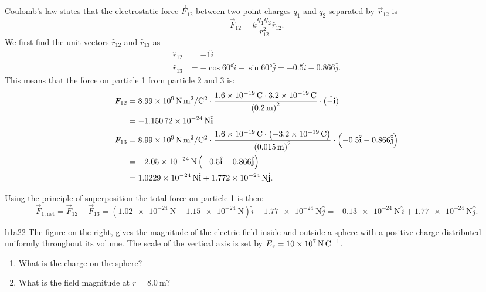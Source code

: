   \begin{derivation}
    Coulomb's law states that the electrostatic force $\Vec{F}_{12}$ between two point charges $q_1$ and $q_2$ separated by $\Vec{r}_{12}$ is
    \begin{equation*}
      \Vec{F}_{12} = k \frac{q_1 q_2}{r_{12}^2} \hat{r}_{12}
    .\end{equation*}
    We first find the unit vectors $\hat{r}_{12}$ and $\hat{r}_{13}$ as
    \begin{align*}
      \hat{r}_{12} &= -1 \hat{i} \\
      \hat{r}_{13} &= -\cos \ang{60} \hat{i} - \sin \ang{60} \hat{j} = -\num{0,5} \hat{i} - \num{0,866}  \hat{j}
    .\end{align*}
    This means that the force on particle 1 from particle 2 and 3 is:
    \begin{align*}
      \Vec{F}_{12} &= \qty{8,99e9}{\N.\m^2\per\C^2} \cdot \frac{\qty{1,6e-19}{\C} \cdot \qty{3,2e-19}{\C}}{\left( \qty{0,2}{\m}  \right)^2} \cdot (\hat{-i}) \\
      &= - \qty{1,15072e-24}{\N} \hat{i} \\
      \Vec{F}_{13} &= \qty{8,99e9}{\N.\m^2\per\C^2} \cdot \frac{\qty{1,6e-19}{\C} \cdot \left( - \qty{3,2e-19}{\C} \right)}{\left( \qty{0,015}{\m}  \right)^2} \cdot \left( \num{-0,5} \hat{i} - \num{0,866} \hat{j} \right)  \\
      &= -\qty{2,05e-24}{\N} \left( \num{-0,5} \hat{i} - \num{0,866} \hat{j} \right) \\
      &= \qty{1,0229e-24}{\N} \hat{i} + \qty{1,772e-24}{\N} \hat{j}
    .\end{align*}

    Using the principle of superposition the total force on particle 1 is then:
    \begin{equation*}
      \Vec{F}_{1, \mathrm{net}} = \Vec{F}_{12} + \Vec{F}_{13} = \left( \qty{1,02e-24}{\N} - \qty{1,15e-24}{\N}  \right) \hat{i} + \qty{1,77e-24}{\N} \hat{j} = -\qty{0,13e-24}{\N} \, \hat{i} + \qty{1,77e-24}{\N} \hat{j}
    .\end{equation*}
  \end{derivation}


  \begin{problemwithimage}{h1a2}{2}
    The figure on the right, gives the magnitude of the electric field inside and outside a sphere with a positive charge distributed uniformly throughout its volume.
    The scale of the vertical axis is set by $E_s = \qty{10e7}{\N\per\C}$.

    \begin{enumerate}
      \item What is the charge on the sphere?
      \item What is the field magnitude at $r = \qty{8,0}{\m}$?
    \end{enumerate}
  \end{problemwithimage}

